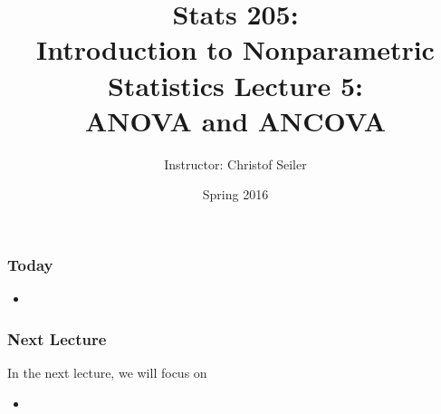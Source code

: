 \documentclass[10pt]{beamer}
\title{\large \bfseries Stats 205: \\ Introduction to Nonparametric Statistics \linebreak \linebreak \linebreak
Lecture 5: \\ ANOVA and ANCOVA}
\author{Instructor: Christof Seiler}
\date{Spring 2016}
\begin{document}
\frame{
\thispagestyle{empty}
\titlepage
}

\begin{frame}
\frametitle{Today}

\begin{itemize}
\item 
\end{itemize}

\end{frame}

\begin{frame}
\frametitle{Next Lecture}

In the next lecture, we will focus on
\begin{itemize}
\item 
\end{itemize}

\end{frame}
\end{document}
